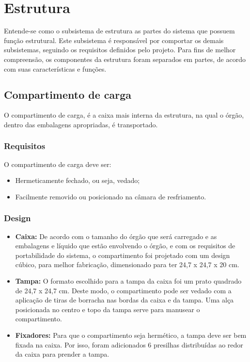 \section{Estrutura}

Entende-se como o subsistema de estrutura as partes do sistema que possuem função estrutural. Este subsistema é responsável por comportar os demais subsistemas, seguindo os requisitos definidos pelo projeto. Para fins de melhor compreensão, os componentes da estrutura foram separados em partes, de acordo com suas características e funções.


\subsection{Compartimento de carga}

O compartimento de carga, é a caixa mais interna da estrutura, na qual o órgão, dentro das embalagens apropriadas, é transportado.

\subsubsection{Requisitos}

O compartimento de carga deve ser:

\begin{itemize}
	\item Hermeticamente fechado, ou seja, vedado;
	\item Facilmente removido ou posicionado na câmara de resfriamento.
\end{itemize}

\subsubsection{Design}

\begin{itemize}
	\item \textbf{Caixa:} De acordo com o tamanho do órgão que será carregado e as embalagens e líquido que estão envolvendo o órgão, e com os requisitos de portabilidade do sistema, o compartimento foi projetado com um design cúbico, para melhor fabricação, dimensionado para ter 24,7 x 24,7 x 20 cm.
	\item \textbf{Tampa:} O formato escolhido para a tampa da caixa foi um prato quadrado de 24,7 x 24,7 cm. Deste modo, o compartimento pode ser vedado com a aplicação de tiras de borracha nas bordas da caixa e da tampa. Uma alça posicionada no centro e topo da tampa serve para manusear o compartimento.
	\item \textbf{Fixadores:} Para que o compartimento seja hermético, a tampa deve ser bem fixada na caixa. Por isso, foram adicionados 6 presilhas distribuídas ao redor da caixa para prender a tampa.
\end{itemize}

